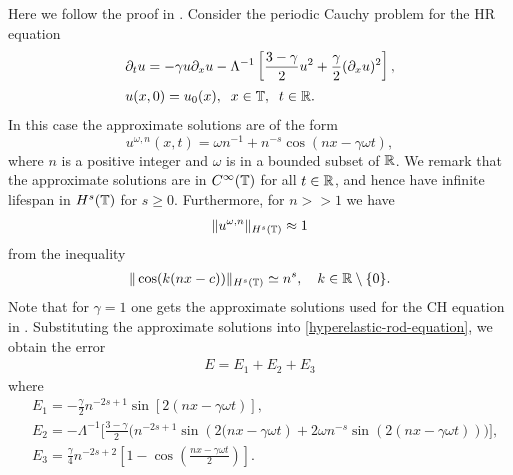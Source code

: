%
Here we follow the proof in \cite{Himonas_2009_Non-uniform-dep-per}. 
Consider the periodic Cauchy problem for the HR equation
%
\begin{align}
& \partial_t u = -\gamma u \partial_x u  - \Lambda^{-1} \left[ \frac{3 - 
\gamma}{2}u^2 +
\frac{\gamma}{2}(\partial_x u)^2 \right] ,
\label{hyperelastic-rod-equation}
\\
& u(x,0) = u_0(x), \; \; x \in \mathbb{T}, \; \; t \in \mathbb{R}.  \label{init-cond}
\end{align}
%
%
%
In this case the  approximate solutions are of the form
%
%
\begin{equation}
\label{approx-solutions-form}
u^{\omega,n}(x,t) = \omega n^{-1} + n^{-s} \cos \left( nx - \gamma \omega t
\right), 
\end{equation}
where $n$ is a positive integer and $\omega$ is in a bounded subset of 
$\mathbb{R}$. We remark that the approximate 
solutions are in $C^\infty(\mathbb{T})$ for all $t \in \mathbb{R}$, and hence have 
infinite lifespan in $H^s(\mathbb{T})$ for $s  \ge 0$. Furthermore, for $n>>1$ we 
have 
%
%
\begin{equation}
\label{bound-approx}
\begin{split}
\|u^{\omega,n} \|_{H^s(\mathbb{T})} \approx 1	
\end{split}
\end{equation}
%
%
from the inequality
\begin{equation}
\label{1m}
\begin{split}
\|\cos(k(nx-c))\|_{H^s(\mathbb{T})} \simeq n^s, \quad k \in \mathbb{R} \setminus
\{0\}.
\end{split}
\end{equation}
%
%
%
%
Note that for $\gamma=1$ 
one gets the  approximate solutions
used for the CH equation in \cite{Himonas_2009_Non-uniform-dep-per}.
%
%
Substituting the approximate solutions into 
\eqref{hyperelastic-rod-equation}, we obtain the error
%
%
\begin{equation}
\begin{split}
E=
E_1 + E_2 + E_3 \label{57}
\end{split}
\end{equation}
%
%
where
\begin{align}
\label{90u}
& E_1 =
- \frac{\gamma}{2}n^{-2s+1}\sin\left[ 2\left( nx - \gamma \omega t \right)
\right],
\\
\label{90ah}
& E_2 = - \Lambda^{-1} \bigg[ \frac{3-\gamma}{2} \bigg (
n^{-2s+1} \sin\left( 2(nx - \gamma \omega t \right) + 2\omega n^{-s} \sin( 
2(nx - \gamma \omega t))
\bigg )
\bigg ],
\\
& E_3 = \frac{\gamma}{4}
n^{-2s+2} \left [ 1- \cos \left (\frac{nx - \gamma \omega t}{2} \right) 
\right ].
\label{90}
\end{align}
